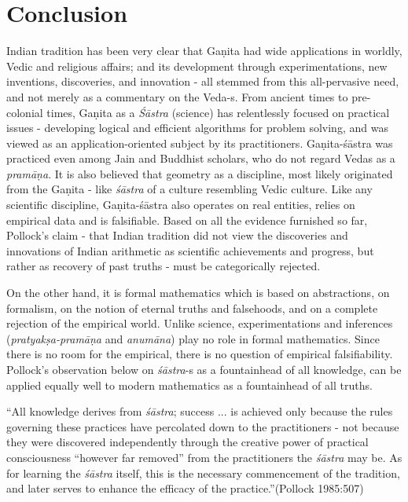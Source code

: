 \medskip

\section*{Conclusion}

Indian tradition has been very clear that Gaṇita had wide applications in worldly, Vedic and religious affairs; and its development through experimentations, new inventions, discoveries, and innovation - all stemmed from this all-pervasive need, and not merely as a commentary on the Veda-s. From ancient times to pre-colonial times, Gaṇita as a {\sl Śāstra} (science) has relentlessly focused on practical issues - developing logical and efficient algorithms for problem solving, and was viewed as an application-oriented subject by its practitioners. Gaṇita-śāstra was practiced even among Jain and Buddhist scholars, who do not regard Vedas as a {\sl pramāṇa}. It is also believed that geometry as a discipline, most likely originated from the Gaṇita - like {\sl śāstra} of a culture resembling Vedic culture. Like any scientific discipline, Gaṇita-śāstra also operates on real entities, relies on empirical data and is falsifiable. Based on all the evidence furnished so far, Pollock’s claim - that Indian tradition did not view the discoveries and innovations of Indian arithmetic as scientific achievements and progress, but rather as recovery of past truths - must be categorically rejected.

On the other hand, it is formal mathematics which is based on abstractions, on formalism, on the notion of eternal truths and falsehoods, and on a complete rejection of the empirical world. Unlike science, experimentations and inferences ({\sl pratyakṣa-pramāṇa} and {\sl anumāna}) play no role in formal mathematics. Since there is no room for the empirical, there is no question of empirical falsifiability. Pollock’s observation below on {\sl śāstra}-s as a fountainhead of all knowledge, can be applied equally well to modern mathematics as a fountainhead of all truths.
\begin{myquote}
``All knowledge derives from {\sl śāstra}; success ... is achieved only because the rules governing these practices have percolated down to the practitioners - not because they were discovered independently through the creative power of practical consciousness ``however far removed'' from the practitioners the {\sl śāstra} may be. As for learning the {\sl śāstra} itself, this is the necessary commencement of the tradition, and later serves to enhance the efficacy of the practice.''\hfill (Pollock 1985:507)
\end{myquote}

